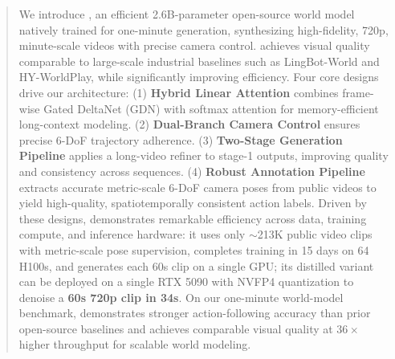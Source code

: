 \begin{abstract}

We introduce \modelname, an efficient 2.6B-parameter open-source world model natively trained for one-minute generation, synthesizing high-fidelity, 720p, minute-scale videos with precise camera control. \modelname achieves visual quality comparable to large-scale industrial baselines such as LingBot-World and HY-WorldPlay, while significantly improving efficiency. Four core designs drive our architecture: (1) \textbf{Hybrid Linear Attention} combines frame-wise Gated DeltaNet (GDN) with softmax attention for memory-efficient long-context modeling. (2) \textbf{Dual-Branch Camera Control} ensures precise 6-DoF trajectory adherence. (3) \textbf{Two-Stage Generation Pipeline} applies a long-video refiner to stage-1 outputs, improving quality and consistency across sequences. (4) \textbf{Robust Annotation Pipeline} extracts accurate metric-scale 6-DoF camera poses from public videos to yield high-quality, spatiotemporally consistent action labels. Driven by these designs, \modelname demonstrates remarkable efficiency across data, training compute, and inference hardware: it uses only $\sim$213K public video clips with metric-scale pose supervision, completes training in 15 days on 64 H100s, and generates each 60s clip on a single GPU; its distilled variant can be deployed on a single RTX 5090 with NVFP4 quantization to denoise a \textbf{60s 720p clip in 34s}. On our one-minute world-model benchmark, \modelname demonstrates stronger action-following accuracy than prior open-source baselines and achieves comparable visual quality at $36\times$ higher throughput for scalable world modeling.

\end{abstract}
